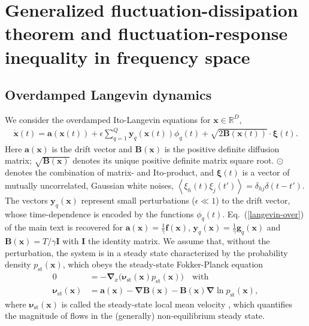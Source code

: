 \documentclass[aps,pre,twocolumn,superscriptaddress,notitlepage]{revtex4-2}
\newcommand{\Av}[1]{\left\langle #1 \right\rangle}
\newcommand{\n}{\nonumber}
\newcommand{\grad}{\bm{\nabla}}
\renewcommand{\eqref}[1]{Eq.~(\ref{#1})}
\begin{document}
\widetext

\appendix

\section{Generalized fluctuation-dissipation theorem and fluctuation-response inequality in frequency space} \label{sec-fffri}




\subsection{Overdamped Langevin dynamics} \label{sec-fffri-over}
We consider the overdamped Ito-Langevin equations for $\bm{x} \in \mathbb{R}^D$,
\begin{align}
\dot{\bm{x}}(t) = \bm{a}(\bm{x}(t)) + \epsilon \sum_{q = 1}^{Q} \bm{y}_q(\bm{x}(t)) \phi_q(t) + \sqrt{2 \bm{B}(\bm{x}(t))} \cdot \bm{\xi}(t) \label{langevin} .
\end{align}
Here $\bm{a}(\bm{x})$ is the drift vector and $\bm{B}(\bm{x})$ is the positive definite diffusion matrix; $\sqrt{\bm{B}(\bm{x})}$ denotes its unique positive definite matrix square root.
$\odot$ denotes the combination of matrix- and Ito-product, and $\bm{\xi}(t)$ is a vector of mutually uncorrelated, Gaussian white noises, $\Av{\xi_h(t) \xi_j(t')} = \delta_{h j} \delta(t-t')$.
The vectors $\bm{y}_q(\bm{x})$ represent small perturbations ($\epsilon \ll 1$) to the drift vector, whose time-dependence is encoded by the functions $\phi_q(t)$.
\eqref{langevin-over} of the main text is recovered for $\bm{a}(\bm{x}) = \frac{1}{\gamma} \bm{f}(\bm{x})$, $\bm{y}_q(\bm{x}) = \frac{1}{\gamma} \bm{g}_q(\bm{x})$ and $\bm{B}(\bm{x}) = T/\gamma \bm{I}$ with $\bm{I}$ the identity matrix.
We assume that, without the perturbation, the system is in a steady state characterized by the probability density $p_\text{st}(\bm{x})$, which obeys the steady-state Fokker-Planck equation \cite{Risken1986}
\begin{align}
0 &= - \grad_x \big( \bm{\nu}_\text{st}(\bm{x}) p_\text{st}(\bm{x}) \big) \quad \text{with} \label{fpe-steady} \\
\bm{\nu}_\text{st}(\bm{x}) &= \bm{a}(\bm{x}) - \grad \bm{B}(\bm{x}) - \bm{B}(\bm{x}) \grad \ln p_\text{st}(\bm{x}) \n ,
\end{align}
where $\bm{\nu}_\text{st}(\bm{x})$ is called the steady-state local mean velocity \cite{Seifert2010a}, which quantifies the magnitude of flows in the (generally) non-equilibrium steady state.
\end{document}
